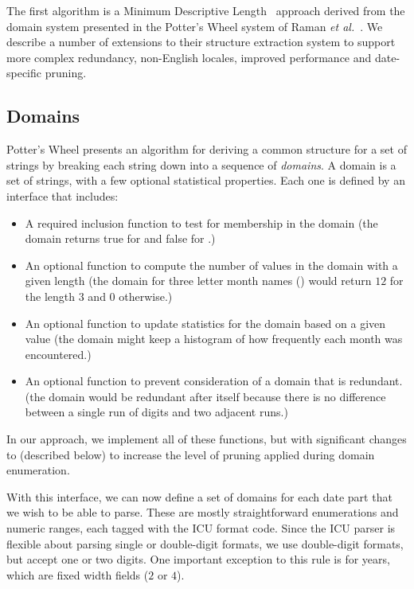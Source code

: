 The first algorithm is a Minimum Descriptive Length~\cite{Rissanen:1978} approach derived from the domain system presented in the Potter's Wheel system of Raman \textit{et al.}~\cite{Raman:2001}. We describe a number of extensions to their structure extraction system to support more complex redundancy, non-English locales, improved performance and date-specific pruning.

\subsection{Domains}
Potter's Wheel presents an algorithm for deriving a common structure for a set of strings by breaking each string down into a sequence of \textit{domains}. A domain is a set of strings, with a few optional statistical properties. Each one is defined by an interface that includes:
\begin{itemize}
\setlength\itemsep{0em}
\item A required inclusion function  to test for membership in the domain
(\eg the domain  returns true for  
and false for .)
\item An optional function  to compute the number of values in the domain with a given length
(\eg the domain for three letter month names () would return $12$ for the length $3$ and $0$ otherwise.)
\item An optional function  to update statistics for the domain based on a given value
(\eg the domain  might keep a histogram of how frequently each month was encountered.)
\item An optional function  to prevent consideration of a domain that is redundant.
(\eg  the domain  would be redundant after itself because there is no difference between a single run of digits and two adjacent runs.)
\end{itemize}

In our approach, we implement all of these functions, but with significant changes to  (described below) to increase the level of pruning applied during
domain enumeration.

With this interface, we can now define a set of domains for each date part that we wish to be able to parse. These are mostly straightforward enumerations and numeric ranges, each tagged with the ICU format code. Since the ICU parser is flexible about parsing single or double-digit formats, we use double-digit formats, but accept one or two digits. One important exception to this rule is for years, which are fixed width fields ($2$ or $4$).

